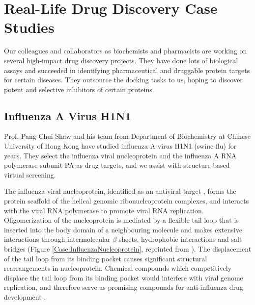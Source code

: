 \chapter{Real-Life Drug Discovery Case Studies}

Our colleagues and collaborators as biochemists and pharmacists are working on several high-impact drug discovery projects. They have done lots of biological assays and succeeded in identifying pharmaceutical and druggable protein targets for certain diseases. They outsource the docking tasks to us, hoping to discover potent and selective inhibitors of certain proteins.

\section{Influenza A Virus H1N1}


Prof. Pang-Chui Shaw and his team from Department of Biochemistry at Chinese University of Hong Kong have studied influenza A virus H1N1 (swine flu) for years. They select the influenza viral nucleoprotein and the influenza A RNA polymerase subunit PA as drug targets, and we assist with structure-based virtual screening.

The influenza viral nucleoprotein, identified as an antiviral target \citep{906}, forms the protein scaffold of the helical genomic ribonucleoprotein complexes, and interacts with the viral RNA polymerase to promote viral RNA replication. Oligomerization of the nucleoprotein is mediated by a flexible tail loop that is inserted into the body domain of a neighbouring molecule and makes extensive interactions through intermolecular $\beta$-sheets, hydrophobic interactions and salt bridges \citep{1140} (Figure \ref{Case:InfluenzaNucleoprotein}, reprinted from \citep{1140}). The displacement of the tail loop from its binding pocket causes significant structural rearrangements in nucleoprotein. Chemical compounds which competitively displace the tail loop from its binding pocket would interfere with viral genome replication, and therefore serve as promising compounds for anti-influenza drug development \citep{1140}.

